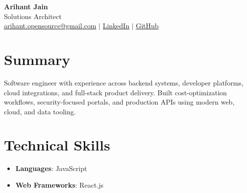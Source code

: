 \documentclass[11pt,a4paper]{article}
\begin{document}
\begin{center}
{\LARGE \textbf{Arihant Jain}}
\\ Solutions Architect
\\ \href{mailto:arihant.opensource@gmail.com}{arihant.opensource@gmail.com} $\mid$ \href{https://linkedin.com/in/arihantjain1208}{LinkedIn} $\mid$ \href{https://github.com/Arihant1208}{GitHub}
\end{center}

\section{Summary}
Software engineer with experience across backend systems, developer platforms, cloud integrations, and full-stack product delivery. Built cost-optimization workflows, security-focused portals, and production APIs using modern web, cloud, and data tooling.

\section{Technical Skills}
\begin{itemize}
  \item \textbf{Languages}: JavaScript
  \item \textbf{Web Frameworks}: React.js
\end{itemize}
\end{document}
